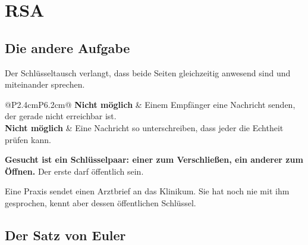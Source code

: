 \chapter{RSA}

\section{Die andere Aufgabe}

\begin{merksatz}
Der Schlüsseltausch verlangt, dass beide Seiten gleichzeitig anwesend sind und miteinander sprechen.

\begin{center}
{\small
\renewcommand{\arraystretch}{1.5}
\begin{tabular}{@{}P{2.4cm}P{6.2cm}@{}}
\toprule
\textbf{Nicht möglich} & Einem Empfänger eine Nachricht senden, der gerade nicht erreichbar ist.\\
\textbf{Nicht möglich} & Eine Nachricht so unterschreiben, dass jeder die Echtheit prüfen kann.\\
\bottomrule
\end{tabular}}
\end{center}

\begin{center}
\begin{minipage}{0.9\textwidth}
\textbf{Gesucht ist ein Schlüsselpaar: einer zum Verschließen, ein anderer zum Öffnen.} Der erste darf öffentlich sein.
\end{minipage}
\end{center}

Eine Praxis sendet einen Arztbrief an das Klinikum. Sie hat noch nie mit ihm gesprochen, kennt aber dessen öffentlichen Schlüssel.

\begin{center}
\begin{minipage}{0.88\textwidth}
\end{minipage}
\end{center}
\end{merksatz}

\section{Der Satz von Euler}

